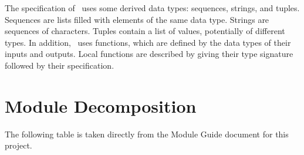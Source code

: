 \documentclass[12pt, titlepage]{article}
\begin{document}
\noindent
The specification of \progname \ uses some derived data types: sequences, 
strings, and
tuples. Sequences are lists filled with elements of the same data type. Strings
are sequences of characters. Tuples contain a list of values, potentially of
different types. In addition, \progname \ uses functions, which
are defined by the data types of their inputs and outputs. Local functions are
described by giving their type signature followed by their specification.

\newpage

\section{Module Decomposition}

The following table is taken directly from the Module Guide document for this project.



\newpage










\end{document}
